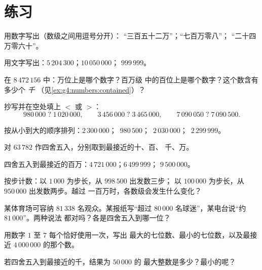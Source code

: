\section{练习}

\begin{exercise}[$\star$]\label{exo:g4:numbers:1}
用数字写出（数级之间用逗号分开）：
“三百五十二万”；“七百万零八”；
“二十四万零六十”。
\end{exercise}

\begin{exercise}[$\star$]\label{exo:g4:numbers:2}
用文字写出：$5\,204\,300$；\quad $10\,050\,000$；\quad
$999\,999$。
\end{exercise}

\begin{exercise}[$\star$]\label{exo:g4:numbers:3}
在 $8\,472\,156$ 中：万位上是哪个数字？百万级
中的百位上是哪个数字？这个数含有多少个 \emph{千}
（见\cref{ex:g4:numbers:contained}）？
\end{exercise}

\begin{exercise}[$\star$]\label{exo:g4:numbers:4}
抄写并在空处填上 $<$ 或 $>$：
\[
980\,000 \;?\; 1\,020\,000, \qquad
3\,456\,000 \;?\; 3\,465\,000, \qquad
7\,090\,050 \;?\; 7\,090\,500 .
\]
\end{exercise}

\begin{exercise}[$\star$]\label{exo:g4:numbers:5}
按从小到大的顺序排列：$2\,300\,000$；\ $980\,500$；\
$2\,030\,000$；\ $2\,299\,999$。
\end{exercise}

\begin{exercise}[$\star$]\label{exo:g4:numbers:6}
对 $63\,782$ 作四舍五入，分别取到最接近的十、百、
千、万。
\end{exercise}

\begin{exercise}[$\star$]\label{exo:g4:numbers:7}
四舍五入到最接近的百万：$4\,721\,000$；\quad $6\,499\,999$；
\quad $9\,500\,000$。
\end{exercise}

\begin{exercise}[$\star$]\label{exo:g4:numbers:8}
按步计数：以 $1\,000$ 为步长，从 $998\,500$ 出发数三步；
以 $100\,000$ 为步长，从 $950\,000$ 出发数两步。越过
一百万时，各数级会发生什么变化？
\end{exercise}

\begin{exercise}[$\star$]\label{exo:g4:numbers:9}
某体育场可容纳 $81\,338$ 名观众。某报纸写“超过
$80\,000$ 名球迷”，某电台说“约 $81\,000$”。两种说法
都对吗？各是四舍五入到哪一位？
\end{exercise}

\begin{exercise}[$\star\star$]\label{exo:g4:numbers:10}
用数字 $1$ 至 $7$ 每个恰好使用一次，写出
最大的七位数、最小的七位数，以及最接近
$4\,000\,000$ 的那个数。
\end{exercise}

\begin{exercise}[$\star\star$]\label{exo:g4:numbers:11}
若四舍五入到最接近的千，结果为 $50\,000$ 的
最大整数是多少？最小的呢？
\end{exercise}
